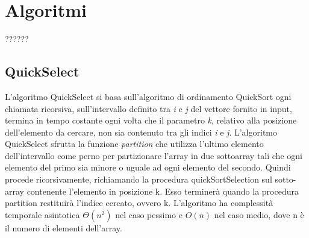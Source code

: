 \section{Algoritmi}
??????

\subsection{QuickSelect}
L'algoritmo QuickSelect si basa sull'algoritmo di ordinamento QuickSort
ogni chiamata ricorsiva, sull'intervallo definito tra \textit{i} e \textit{j}
del vettore fornito in input, termina in tempo costante ogni volta che il parametro \textit{k}, relativo
alla posizione dell'elemento da cercare, non sia contenuto tra gli indici
\textit{i} e \textit{j}.
L'algoritmo QuickSelect sfrutta la funzione \textit{partition} che utilizza l'ultimo elemento dell'intervallo come perno per partizionare l'array in due sottoarray
tali che ogni elemento del primo sia minore o uguale 
ad ogni elemento del secondo. Quindi procede ricorsivamente, richiamando la procedura quickSortSelection sul sotto-array contenente l’elemento in posizione k. Esso terminerà quando la procedura partition restituirà l’indice cercato, ovvero k.
L’algoritmo ha complessità temporale asintotica $\Theta(n^2)$ nel caso pessimo e $O(n)$ nel caso medio, dove n è il numero di elementi dell’array.
